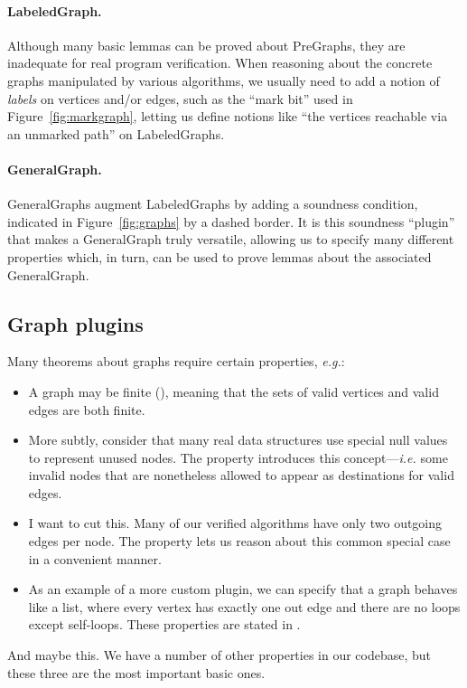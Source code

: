 \paragraph{LabeledGraph.}
Although many basic lemmas can be proved about PreGraphs, they are inadequate for real program verification.
When reasoning about the concrete graphs manipulated by various algorithms,
we usually need to add a notion of \emph{labels} on vertices and/or edges, such as
the ``mark bit'' used in Figure~\ref{fig:markgraph}, letting us define notions like ``the vertices reachable via an unmarked path''
on LabeledGraphs.
\fi

\vspace{-0.75ex}
\paragraph{GeneralGraph.}
GeneralGraphs augment LabeledGraphs by adding a soundness condition, indicated in 
Figure~\ref{fig:graphs} by a dashed border. It is this soundness ``plugin'' that makes 
a GeneralGraph truly versatile, allowing us to specify many different properties 
which, in turn, can be used to prove lemmas about the associated GeneralGraph.

\subsection{Graph plugins}

\label{subsec:graphplugins}
Many theorems about graphs require certain properties, \emph{e.g.}:
\begin{itemize}
\vspace{-1ex}
\item A graph may be finite (), meaning that the sets of valid vertices and valid edges are both finite.
\vspace{-1ex}
\item More subtly, consider that many real data structures use special null values to represent unused nodes.  The  property introduces this concept---\emph{i.e.} some invalid nodes that are nonetheless allowed to appear as destinations for valid edges.
\vspace{-1ex}
\item {\color{blue}I want to cut this.} Many of our verified algorithms have only two outgoing edges per node.  The  property lets us reason about this common special case in a convenient manner.
\item As an example of a more custom plugin, we can specify that a graph behaves like a list, where every vertex has exactly one out edge and there are no loops except self-loops. These properties are stated in .
\vspace{-1ex}
\end{itemize}
{\color{blue}And maybe this.} We have a number of other properties in our codebase, but these three are the most important basic ones.

